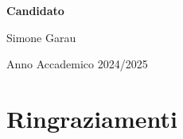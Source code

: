 \documentclass[12pt, a4paper, twoside]{book}
\begin{document}
\begin{titlepage}
\begin{minipage}[t]{0.45\textwidth}
    \centering

    {\bfseries Candidato\par}

    Simone Garau 

    \vspace{.5cm}

\end{minipage}

\vfill
 

{\large Anno Accademico 2024/2025\par}
 
\end{titlepage} %
\clearpage

\clearpage




\tableofcontents
 
\mainmatter

\onehalfspacing

\sloppy








\backmatter



 

\chapter*{Ringraziamenti}


\appendix

 
\end{document}
